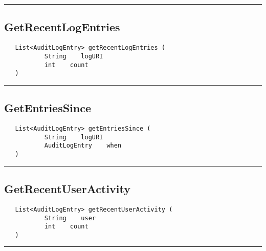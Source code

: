 \rule{15cm}{2pt}
\subsection{GetRecentLogEntries}
\label{Api:GetRecentLogEntries}
\begin{verbatim}
   List<AuditLogEntry> getRecentLogEntries (
           String    logURI
           int    count
   )
\end{verbatim}



\rule{15cm}{2pt}
\subsection{GetEntriesSince}
\label{Api:GetEntriesSince}
\begin{verbatim}
   List<AuditLogEntry> getEntriesSince (
           String    logURI
           AuditLogEntry    when
   )
\end{verbatim}



\rule{15cm}{2pt}
\subsection{GetRecentUserActivity}
\label{Api:GetRecentUserActivity}
\begin{verbatim}
   List<AuditLogEntry> getRecentUserActivity (
           String    user
           int    count
   )
\end{verbatim}



\rule{15cm}{2pt}
